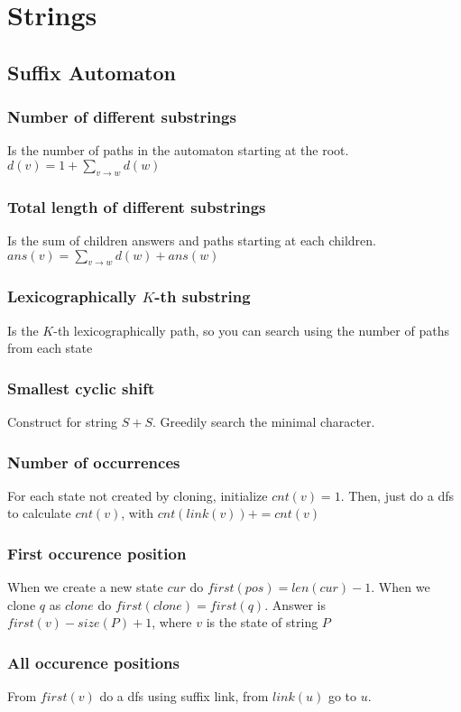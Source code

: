 \chapter{Strings}


\section{Suffix Automaton}
\subsection{Number of different substrings}
        Is the number of paths in the automaton starting at the root.
        $d(v) = 1 + \sum_{v \rightarrow w} d(w)$

\subsection{Total length of different substrings}
        Is the sum of children answers and paths starting 
        at each children.
        $ans(v) = \sum_{v \rightarrow w} d(w) + ans(w)$


\subsection{Lexicographically $K$-th substring}
        Is the $K$-th lexicographically path, so you can search using the number of paths from each state

\subsection{Smallest cyclic shift}
        Construct for string $S + S$. Greedily search 
        the minimal character.

\subsection{Number of occurrences}
        For each state not created by cloning, initialize $cnt(v) = 1$. 
        Then, just do a dfs to calculate $cnt(v)$, with $cnt(link(v)) += cnt(v)$
\subsection{First occurence position}
        When we create a new state $cur$ do $first(pos) = len(cur) - 1$.
        When we clone $q$ as $clone$ do $first(clone) = first(q)$.
        Answer is $first(v) - size(P) + 1$, where $v$ is the state of string $P$

\subsection{All occurence positions}
        From $first(v)$ do a dfs using suffix link, from $link(u)$ go to $u$.
